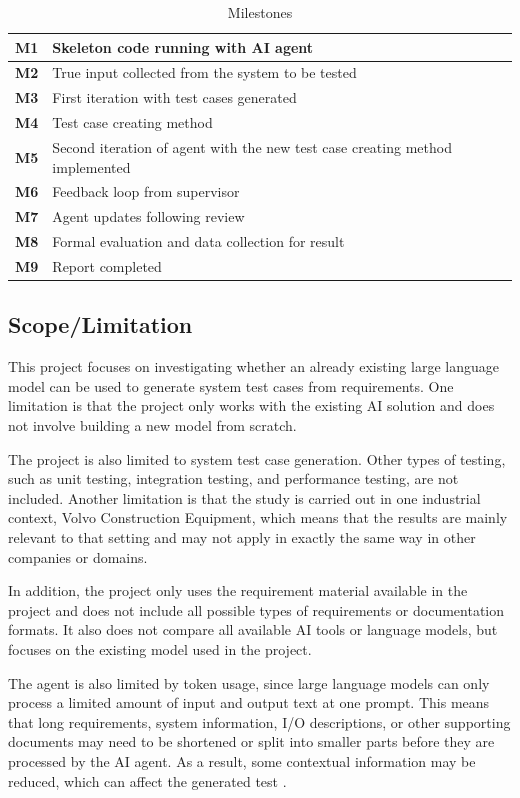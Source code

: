 \documentclass[a4paper,12pt]{article}
\begin{document}
\begin{table}[h]
\begin{tabular}{|p{1.2cm}|p{11.6cm}|}
\hline
\textbf{M1} & Skeleton code running with AI agent\\ \hline
\textbf{M2} & True input collected from the system to be tested\\ \hline
\textbf{M3} & First iteration with test cases generated\\ \hline
\textbf{M4} & Test case creating method\\ \hline
\textbf{M5} & Second iteration of agent with the new test case creating method implemented\\ \hline
\textbf{M6} & Feedback loop from supervisor\\ \hline
\textbf{M7} & Agent updates following review\\ \hline
\textbf{M8} & Formal evaluation and data collection for result\\ \hline
\textbf{M9} & Report completed\\ \hline
\end{tabular}
\caption{Milestones}
\label{tab:milestones}
\end{table}

\subsection{Scope/Limitation}
This project focuses on investigating whether an already existing large language model can be used to generate system test cases from requirements. One limitation is that the project only works with the existing AI solution and does not involve building a new model from scratch.

The project is also limited to system test case generation. Other types of testing, such as unit testing, integration testing, and performance testing, are not included. Another limitation is that the study is carried out in one industrial context, Volvo Construction Equipment, which means that the results are mainly relevant to that setting and may not apply in exactly the same way in other companies or domains.

In addition, the project only uses the requirement material available in the project and does not include all possible types of requirements or documentation formats. It also does not compare all available AI tools or language models, but focuses on the existing model used in the project.

The agent is also limited by token usage, since large language models can only process a limited amount of input and output text at one prompt. This means that long requirements, system information, I/O descriptions, or other supporting documents may need to be shortened or split into smaller parts before they are processed by the AI agent. As a result, some contextual information may be reduced, which can affect the generated test \cite{openaiTokens}.
\end{document}
